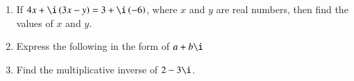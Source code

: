 \begin{enumerate}[label=\thesubsection.\arabic*, ref=\thesubsection.\theenumi]
	\item If $4x + \i\brak{3x-y} = 3 + \i\brak{-6}$, where $x$ and $y$ are real numbers, then find the values of $x$ and $y$.
	\item Express the following in the form of $a+b\i$
		\begin{enumerate}[itemsep=1ex]
		\end{enumerate}
	\item Find the multiplicative inverse of $2-3\i$.
\end{enumerate}
\iffalse
Solve
\begin{enumerate}[label=\thesubsection.\arabic*, ref=\thesubsection.\theenumi,resume*]
	\begin{multicols}{2}
	\end{multicols}
\end{enumerate}
\fi
